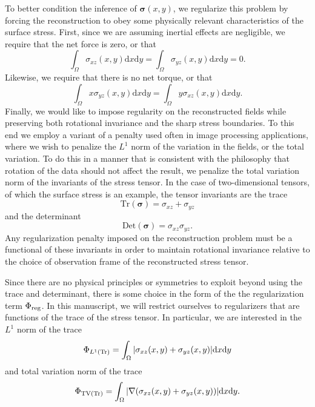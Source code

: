 \documentclass[aps,prl,reprint,twocolumn,groupedaddress,showpacs]{revtex4-1}
\newcommand{\bsigma}{{\boldsymbol\sigma}}
\def\dd{\mbox{d}}
\begin{document}
To better condition the inference of $\bsigma(x,y)$, we regularize
this problem by forcing the reconstruction to obey some physically
relevant characteristics of the surface stress. First, since we are
assuming inertial effects are negligible, we require that the net
force is zero, or that
\begin{equation}
\int_\Omega\sigma_{xz}(x,y)\dd x \dd y= \int_\Omega\sigma_{yz}(x,y)\dd x \dd y = 0.
\label{NOFORCE}
\end{equation}
Likewise, we require that there is no net torque, or that
\begin{equation}
\int_\Omega x \sigma_{yz}(x,y) \dd x \dd y  = \int_\Omega y\sigma_{xz}(x,y) \dd x \dd y.
\label{NOTORQUE}
\end{equation}
%
Finally, we would like to impose regularity on the reconstructed
fields while preserving both rotational invariance and the sharp
stress boundaries. To this end we employ a variant of a penalty used often in
image processing applications, where we wish to penalize the $L^1$
norm of the variation in the fields, or the total variation. To do
this in a manner that is consistent with the philosophy that
rotation of the data should not affect the result, we penalize the
total variation norm of the invariants of the stress tensor. In the
case of two-dimensional tensors, of which the surface stress is an
example, the tensor invariants are the trace
\begin{equation}
\textrm{Tr}(\bsigma) = \sigma_{xz} + \sigma_{yz}
\end{equation}
and the determinant
\begin{equation}
\textrm{Det}(\bsigma) = \sigma_{xz} \sigma_{yz}.
\end{equation}
Any regularization penalty imposed on the reconstruction problem must
be a functional of these invariants in order to maintain rotational
invariance relative to the choice of observation frame of the
reconstructed stress tensor.
 
Since there are no physical principles or symmetries to exploit beyond
using the trace and determinant, there is some choice in the form of
the the regularization term $\Phi_{\rm reg}$.  In this manuscript, we
will restrict ourselves to regularizers that are 
functions of the trace of the stress tensor. In
particular, we are interested in the $L^1$ norm of the trace
\begin{equation}
\Phi_{L^1({\rm Tr})} = \int_\Omega \vert \sigma_{xz}(x,y) + \sigma_{yz}(x,y)  \vert \dd x\dd y
\label{eq:PhiL1Tr}
\end{equation}
and total variation norm of the trace
%
\begin{equation}
\Phi_{\rm TV(Tr)} =  \int_\Omega | \nabla(\sigma_{xz}(x,y) + \sigma_{yz}(x,y) ) | \dd x\dd y.
\label{eq:PhiTVTr}
\end{equation}
\end{document}
